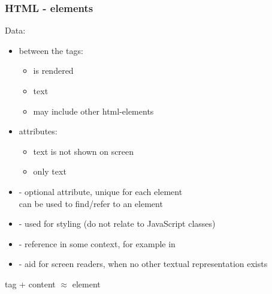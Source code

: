 \begin{frame}[fragile]
\frametitle{HTML - elements}
\color{structure}
Data:
\begin{itemize}\color{structure}
\item between the tags: 
  \begin{itemize}\color{structure}
  \item is rendered
  \item text 
  \item may include other html-elements 
  \end{itemize}
\end{itemize}

\begin{itemize}\color{structure}
\item attributes:  
  \begin{itemize}\color{structure}
    \item text is not shown on screen
    \item only text
  \end{itemize}
  \item {} - optional attribute, unique for each element\\ can be used to find/refer to an element
  \item {} - used for styling (do not relate to JavaScript classes)
  \item {} - reference in some context, for example in 
  \item {} - aid for screen readers, when no other textual representation exists
\end{itemize}
\bigskip
tag + content $\approx$ element

\end{frame}
